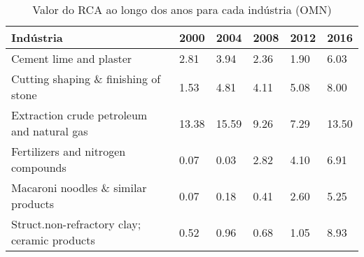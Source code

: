 \begin{table}
\centering
\caption{Valor do RCA ao longo dos anos para cada indústria (OMN)}
\label{tab:ex3-tempo-OMN}
\begin{tabular}{p{6cm}p{1.5cm}p{1.5cm}p{1.5cm}p{1.5cm}p{1.5cm}}
\toprule
                                   Indústria &  2000 &  2004 & 2008 & 2012 &  2016 \\
\midrule
                     Cement lime and plaster &  2.81 &  3.94 & 2.36 & 1.90 &  6.03 \\
        Cutting shaping \& finishing of stone &  1.53 &  4.81 & 4.11 & 5.08 &  8.00 \\
  Extraction crude petroleum and natural gas & 13.38 & 15.59 & 9.26 & 7.29 & 13.50 \\
          Fertilizers and nitrogen compounds &  0.07 &  0.03 & 2.82 & 4.10 &  6.91 \\
         Macaroni noodles \& similar products &  0.07 &  0.18 & 0.41 & 2.60 &  5.25 \\
Struct.non-refractory clay; ceramic products &  0.52 &  0.96 & 0.68 & 1.05 &  8.93 \\
\bottomrule
\end{tabular}
\end{table}
